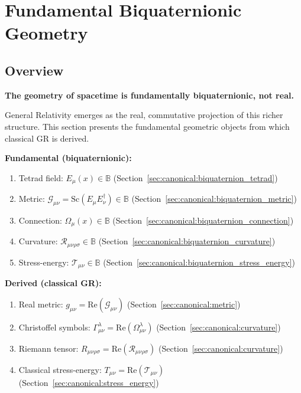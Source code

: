 \documentclass[12pt,a4paper]{article}
\begin{document}



\section{Fundamental Biquaternionic Geometry}
\label{sec:biquaternion_geometry}

\subsection{Overview}

\textbf{The geometry of spacetime is fundamentally biquaternionic, not real.}

General Relativity emerges as the real, commutative projection of this richer structure. This section presents the fundamental geometric objects from which classical GR is derived.

\begin{tcolorbox}[colback=green!5!white,colframe=green!75!black,title=Hierarchy of Geometric Objects]
\textbf{Fundamental (biquaternionic):}
\begin{enumerate}
    \item Tetrad field: $E_\mu(x) \in \mathbb{B}$ (Section~\ref{sec:canonical:biquaternion_tetrad})
    \item Metric: $\mathcal{G}_{\mu\nu} = \text{Sc}(E_\mu E_\nu^\dagger) \in \mathbb{B}$ (Section~\ref{sec:canonical:biquaternion_metric})
    \item Connection: $\Omega_\mu(x) \in \mathbb{B}$ (Section~\ref{sec:canonical:biquaternion_connection})
    \item Curvature: $\mathcal{R}_{\mu\nu\rho\sigma} \in \mathbb{B}$ (Section~\ref{sec:canonical:biquaternion_curvature})
    \item Stress-energy: $\mathcal{T}_{\mu\nu} \in \mathbb{B}$ (Section~\ref{sec:canonical:biquaternion_stress_energy})
\end{enumerate}

\textbf{Derived (classical GR):}
\begin{enumerate}
    \item Real metric: $g_{\mu\nu} = \text{Re}(\mathcal{G}_{\mu\nu})$ (Section~\ref{sec:canonical:metric})
    \item Christoffel symbols: $\Gamma^\lambda_{\mu\nu} = \text{Re}(\Omega^\lambda_{\mu\nu})$ (Section~\ref{sec:canonical:curvature})
    \item Riemann tensor: $R_{\mu\nu\rho\sigma} = \text{Re}(\mathcal{R}_{\mu\nu\rho\sigma})$ (Section~\ref{sec:canonical:curvature})
    \item Classical stress-energy: $T_{\mu\nu} = \text{Re}(\mathcal{T}_{\mu\nu})$ (Section~\ref{sec:canonical:stress_energy})
\end{enumerate}
\end{tcolorbox}
\end{document}
